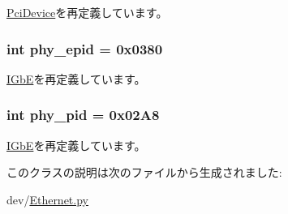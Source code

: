 \hyperlink{classPci_1_1PciDevice_aa90d1ebfb6ac8c64983451e2196e342f}{PciDevice}を再定義しています。\hypertarget{classEthernet_1_1IGbE__e1000_a5bb971e985d09a29903843736a36c7d8}{
\subsubsection[{phy\_\-epid}]{\setlength{\rightskip}{0pt plus 5cm}int {\bf phy\_\-epid} = 0x0380}}
\label{classEthernet_1_1IGbE__e1000_a5bb971e985d09a29903843736a36c7d8}


\hyperlink{classEthernet_1_1IGbE_aa5410782903449f47b14de3c73f6cb49}{IGbE}を再定義しています。\hypertarget{classEthernet_1_1IGbE__e1000_a229cca8e73c20d1d9c9089d20967f7fa}{
\subsubsection[{phy\_\-pid}]{\setlength{\rightskip}{0pt plus 5cm}int {\bf phy\_\-pid} = 0x02A8}}
\label{classEthernet_1_1IGbE__e1000_a229cca8e73c20d1d9c9089d20967f7fa}


\hyperlink{classEthernet_1_1IGbE_a3cdba89a4899636d7e18cc917992ca1d}{IGbE}を再定義しています。

このクラスの説明は次のファイルから生成されました:\begin{DoxyCompactItemize}
\item 
dev/\hyperlink{Ethernet_8py}{Ethernet.py}\end{DoxyCompactItemize}

